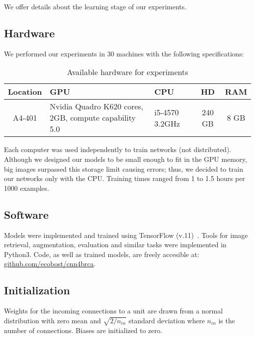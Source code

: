We offer details about the learning stage of our experiments.

\subsection{Hardware}
We performed our experiments in 30 machines with the following specifications:
\begin{table}[h]
	\centering
	\begin{tabular}{cp{3.8cm}p{1.8cm}cc}
	\hline
	\textbf{Location}	& \textbf{GPU}	& \textbf{CPU} &\textbf{HD}	& \textbf{RAM}\\
	\hline
	A4-401 & Nvidia Quadro K620 \newline 384 cores, 2GB, compute capability 5.0 & i5-4570 \newline 3.2GHz	& 240 GB & 8 GB\\
	\hline
	\end{tabular}
	\caption{Available hardware for experiments}
\end{table}

Each computer was used independently to train networks (not distributed). Although we designed our models to be small enough to fit in the GPU memory, big images surpassed this storage limit causing errors; thus, we decided to train our networks only with the CPU. Training times ranged from 1 to 1.5 hours per 1000 examples.

\subsection{Software}
Models were implemented and trained using TensorFlow (v.11)~\cite{Abadi2015}. Tools for image retrieval, augmentation, evaluation and similar tasks were implemented in Python3.
Code, as well as trained models, are freely accesible at: \url{github.com/ecobost/cnn4brca}.

\subsection{Initialization}
Weights for the incoming connections to a unit are drawn from a normal distribution with zero mean and $\sqrt{2/n_{in}}$ standard deviation where $n_{in}$ is the number of connections. Biases are initialized to zero.

